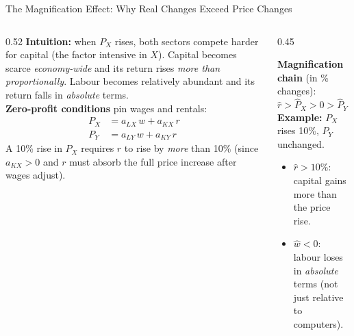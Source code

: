 \documentclass[aspectratio=169]{beamer}
\begin{document}
\begin{frame}{The Magnification Effect: Why Real Changes Exceed Price Changes}
\begin{columns}[T]
\begin{column}{0.52\textwidth}
\textbf{Intuition:} when $P_X$ rises, both sectors
compete harder for capital (the factor intensive in $X$).
Capital becomes scarce \emph{economy-wide} and its
return rises \emph{more than proportionally}.
Labour becomes relatively abundant and its return
falls in \emph{absolute} terms.\\[0.4em]
\textbf{Zero-profit conditions} pin wages and rentals:
\[\begin{aligned}
P_X &= a_{LX}\,w + a_{KX}\,r\\
P_Y &= a_{LY}\,w + a_{KY}\,r
\end{aligned}\]
A 10\% rise in $P_X$ requires $r$ to rise by
\emph{more} than 10\% (since $a_{KX}>0$ and $r$ must
absorb the full price increase after wages adjust).
\end{column}
\begin{column}{0.45\textwidth}
\begin{varbox}
\small\textbf{Magnification chain} (in \% changes):
\[\hat{r} > \hat{P}_X > 0 > \hat{P}_Y > \hat{w}\]
\textbf{Example:} $P_X$ rises 10\%, $P_Y$ unchanged.
\begin{itemize}
  \item $\hat{r} > 10\%$: capital gains more than
        the price rise.
  \item $\hat{w} < 0$: labour loses in \emph{absolute}
        terms (not just relative to computers).
\end{itemize}
\end{varbox}
\vspace{0.4em}
\end{column}
\end{columns}
\end{frame}
\end{document}
